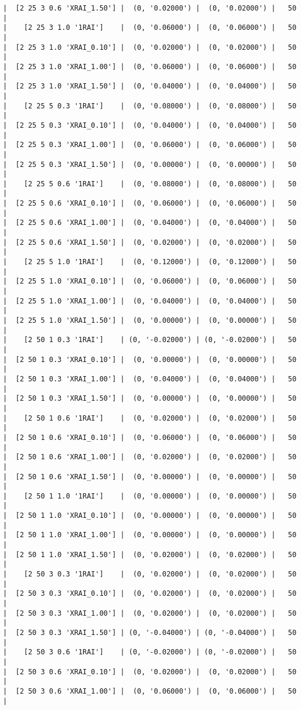 \documentclass{article}
\begin{document}
\begin{verbatim}
|  [2 25 3 0.6 'XRAI_1.50'] |  (0, '0.02000') |  (0, '0.02000') |   50  |
|    [2 25 3 1.0 '1RAI']    |  (0, '0.06000') |  (0, '0.06000') |   50  |
|  [2 25 3 1.0 'XRAI_0.10'] |  (0, '0.02000') |  (0, '0.02000') |   50  |
|  [2 25 3 1.0 'XRAI_1.00'] |  (0, '0.06000') |  (0, '0.06000') |   50  |
|  [2 25 3 1.0 'XRAI_1.50'] |  (0, '0.04000') |  (0, '0.04000') |   50  |
|    [2 25 5 0.3 '1RAI']    |  (0, '0.08000') |  (0, '0.08000') |   50  |
|  [2 25 5 0.3 'XRAI_0.10'] |  (0, '0.04000') |  (0, '0.04000') |   50  |
|  [2 25 5 0.3 'XRAI_1.00'] |  (0, '0.06000') |  (0, '0.06000') |   50  |
|  [2 25 5 0.3 'XRAI_1.50'] |  (0, '0.00000') |  (0, '0.00000') |   50  |
|    [2 25 5 0.6 '1RAI']    |  (0, '0.08000') |  (0, '0.08000') |   50  |
|  [2 25 5 0.6 'XRAI_0.10'] |  (0, '0.06000') |  (0, '0.06000') |   50  |
|  [2 25 5 0.6 'XRAI_1.00'] |  (0, '0.04000') |  (0, '0.04000') |   50  |
|  [2 25 5 0.6 'XRAI_1.50'] |  (0, '0.02000') |  (0, '0.02000') |   50  |
|    [2 25 5 1.0 '1RAI']    |  (0, '0.12000') |  (0, '0.12000') |   50  |
|  [2 25 5 1.0 'XRAI_0.10'] |  (0, '0.06000') |  (0, '0.06000') |   50  |
|  [2 25 5 1.0 'XRAI_1.00'] |  (0, '0.04000') |  (0, '0.04000') |   50  |
|  [2 25 5 1.0 'XRAI_1.50'] |  (0, '0.00000') |  (0, '0.00000') |   50  |
|    [2 50 1 0.3 '1RAI']    | (0, '-0.02000') | (0, '-0.02000') |   50  |
|  [2 50 1 0.3 'XRAI_0.10'] |  (0, '0.00000') |  (0, '0.00000') |   50  |
|  [2 50 1 0.3 'XRAI_1.00'] |  (0, '0.04000') |  (0, '0.04000') |   50  |
|  [2 50 1 0.3 'XRAI_1.50'] |  (0, '0.00000') |  (0, '0.00000') |   50  |
|    [2 50 1 0.6 '1RAI']    |  (0, '0.02000') |  (0, '0.02000') |   50  |
|  [2 50 1 0.6 'XRAI_0.10'] |  (0, '0.06000') |  (0, '0.06000') |   50  |
|  [2 50 1 0.6 'XRAI_1.00'] |  (0, '0.02000') |  (0, '0.02000') |   50  |
|  [2 50 1 0.6 'XRAI_1.50'] |  (0, '0.00000') |  (0, '0.00000') |   50  |
|    [2 50 1 1.0 '1RAI']    |  (0, '0.00000') |  (0, '0.00000') |   50  |
|  [2 50 1 1.0 'XRAI_0.10'] |  (0, '0.00000') |  (0, '0.00000') |   50  |
|  [2 50 1 1.0 'XRAI_1.00'] |  (0, '0.00000') |  (0, '0.00000') |   50  |
|  [2 50 1 1.0 'XRAI_1.50'] |  (0, '0.02000') |  (0, '0.02000') |   50  |
|    [2 50 3 0.3 '1RAI']    |  (0, '0.02000') |  (0, '0.02000') |   50  |
|  [2 50 3 0.3 'XRAI_0.10'] |  (0, '0.02000') |  (0, '0.02000') |   50  |
|  [2 50 3 0.3 'XRAI_1.00'] |  (0, '0.02000') |  (0, '0.02000') |   50  |
|  [2 50 3 0.3 'XRAI_1.50'] | (0, '-0.04000') | (0, '-0.04000') |   50  |
|    [2 50 3 0.6 '1RAI']    | (0, '-0.02000') | (0, '-0.02000') |   50  |
|  [2 50 3 0.6 'XRAI_0.10'] |  (0, '0.02000') |  (0, '0.02000') |   50  |
|  [2 50 3 0.6 'XRAI_1.00'] |  (0, '0.06000') |  (0, '0.06000') |   50  |

\end{verbatim}
\end{document}
